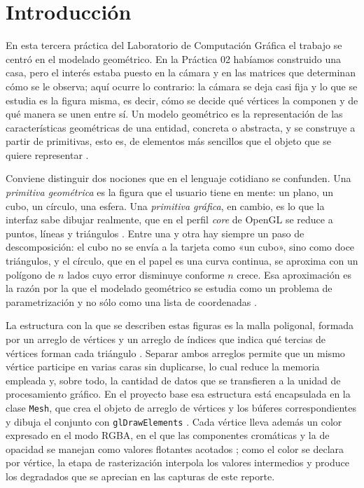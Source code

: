 
\section{Introducción}
En esta tercera práctica del Laboratorio de Computación Gráfica el trabajo se centró en el modelado geométrico. En la Práctica 02 habíamos construido una casa, pero el interés estaba puesto en la cámara y en las matrices que determinan cómo se le observa; aquí ocurre lo contrario: la cámara se deja casi fija y lo que se estudia es la figura misma, es decir, cómo se decide qué vértices la componen y de qué manera se unen entre sí. Un modelo geométrico es la representación de las características geométricas de una entidad, concreta o abstracta, y se construye a partir de primitivas, esto es, de elementos más sencillos que el objeto que se quiere representar \cite{teodoro_manual03}.

Conviene distinguir dos nociones que en el lenguaje cotidiano se confunden. Una \emph{primitiva geométrica} es la figura que el usuario tiene en mente: un plano, un cubo, un círculo, una esfera. Una \emph{primitiva gráfica}, en cambio, es lo que la interfaz sabe dibujar realmente, que en el perfil \textit{core} de OpenGL se reduce a puntos, líneas y triángulos \cite{shreiner_opengl}. Entre una y otra hay siempre un paso de descomposición: el cubo no se envía a la tarjeta como «un cubo», sino como doce triángulos, y el círculo, que en el papel es una curva continua, se aproxima con un polígono de $n$ lados cuyo error disminuye conforme $n$ crece. Esa aproximación es la razón por la que el modelado geométrico se estudia como un problema de parametrización y no sólo como una lista de coordenadas \cite{hearn_baker}.

La estructura con la que se describen estas figuras es la malla poligonal, formada por un arreglo de vértices y un arreglo de índices que indica qué tercias de vértices forman cada triángulo \cite{marschner_shirley}. Separar ambos arreglos permite que un mismo vértice participe en varias caras sin duplicarse, lo cual reduce la memoria empleada y, sobre todo, la cantidad de datos que se transfieren a la unidad de procesamiento gráfico. En el proyecto base esa estructura está encapsulada en la clase \texttt{Mesh}, que crea el objeto de arreglo de vértices y los búferes correspondientes y dibuja el conjunto con \texttt{glDrawElements} \cite{learnopengl_hello}. Cada vértice lleva además un color expresado en el modo RGBA, en el que las componentes cromáticas y la de opacidad se manejan como valores flotantes acotados \cite{microsoft_rgba}; como el color se declara por vértice, la etapa de rasterización interpola los valores intermedios y produce los degradados que se aprecian en las capturas de este reporte.

